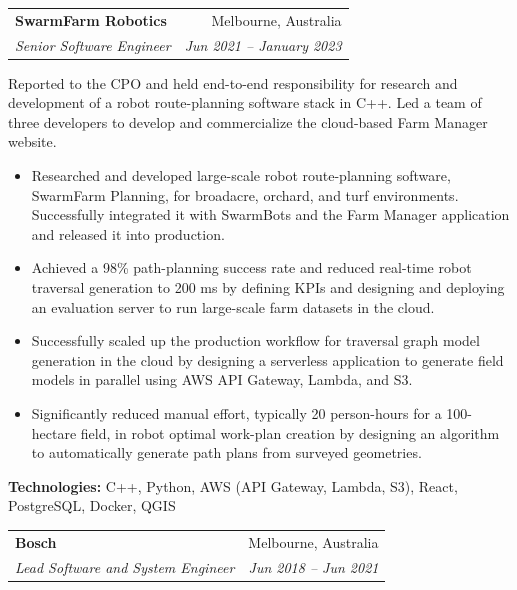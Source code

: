 \documentclass[letterpaper,11pt]{article}
\makeatletter
\newcommand{\resumeItemNoBullet}[4]{
  \vspace{-1pt}
    \begin{tabular*}{0.97\textwidth}{l@{\extracolsep{\fill}}r}
      \textbf{#1} & #2 \\
      \textit{\small#3} & \textit{\small #4} \\
    \end{tabular*}\vspace{-7pt}
}
\newcommand{\resumeSubHeadingListStart}{\begin{itemize}[leftmargin=*]}
\newcommand{\resumeSubHeadingListEnd}{\end{itemize}}
\makeatother
\begin{document}
\resumeItemNoBullet
{SwarmFarm Robotics}{Melbourne, Australia}
{Senior Software Engineer}{Jun 2021 -- January 2023}

\vspace{10pt}
{Reported to the CPO and held end-to-end responsibility for research and development of a robot route-planning software stack in C++. Led a team of three developers to develop and commercialize the cloud-based Farm Manager website.}
  \resumeSubHeadingListStart
    \item Researched and developed large-scale robot route-planning software, SwarmFarm Planning, for broadacre, orchard, and turf environments. Successfully integrated it with SwarmBots and the Farm Manager application and released it into production.
    \item Achieved a 98\% path-planning success rate and reduced real-time robot traversal generation to 200 ms by defining KPIs and designing and deploying an evaluation server to run large-scale farm datasets in the cloud.
    \item Successfully scaled up the production workflow for traversal graph model generation in the cloud by designing a serverless application to generate field models in parallel using AWS API Gateway, Lambda, and S3.
    \item Significantly reduced manual effort, typically 20 person-hours for a 100-hectare field, in robot optimal work-plan creation by designing an algorithm to automatically generate path plans from surveyed geometries.
  \resumeSubHeadingListEnd
  \vspace{2pt}
  {\small \textbf{Technologies:} C++, Python, AWS (API Gateway, Lambda, S3), React, PostgreSQL, Docker, QGIS}

\resumeItemNoBullet
{Bosch}{Melbourne, Australia}
{Lead Software and System Engineer}{Jun 2018 -- Jun 2021}
\end{document}
